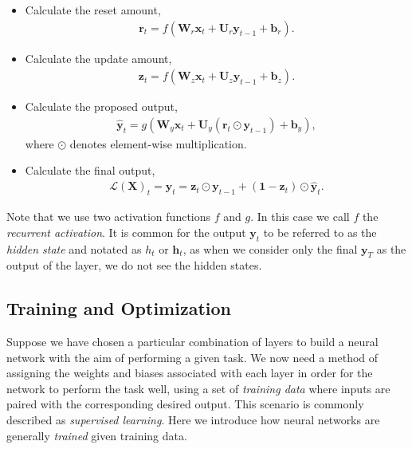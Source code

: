 \documentclass{somasmsc}
\begin{document}
\begin{itemize}
    \item Calculate the reset amount,
    \begin{align*}
    \pmb{r}_t = f(\mathbf{W}_r \pmb{x}_t + \mathbf{U}_r \pmb{y}_{t-1} + \pmb{b}_r).
    \end{align*}
    \item Calculate the update amount,
    \begin{align*}
    \pmb{z}_t = f(\mathbf{W}_z \pmb{x}_t + \mathbf{U}_z \pmb{y}_{t-1} + \pmb{b}_z).
    \end{align*}
    \item Calculate the proposed output,
    \begin{align*}
    \hat{\pmb{y}}_t = g(\mathbf{W}_y \pmb{x}_t + \mathbf{U}_y \left(\pmb{r}_t \odot \pmb{y}_{t-1}\right) + \pmb{b}_y),
    \end{align*}
    where $\odot$ denotes element-wise  multiplication.
    \item Calculate the final output,
    \begin{align*}
    \mathcal{L}\left(\mathbf{X}\right)_t = \pmb{y}_t = \pmb{z}_t \odot \pmb{y}_{t-1} + \left(\mathbf{1} - \pmb{z}_t\right) \odot \hat{\pmb{y}}_t.
    \end{align*}
\end{itemize}
Note that we use two activation functions $f$ and $g$. In this case we call $f$ the \textit{recurrent activation}. It is common for the output $\pmb{y}_t$ to be referred to as the \textit{hidden state} and notated as $h_t$ or $\pmb{h}_t$, as when we consider only the final $\pmb{y}_T$ as the output of the layer, we do not see the hidden states.

\subsection{Training and Optimization}\label{intro:train}

Suppose we have chosen a particular combination of layers to build a neural network with the aim of performing a given task. We now need a method of assigning the weights and biases associated with each layer in order for the network to perform the task well, using a set of \textit{training data} where inputs are paired with the corresponding desired output. This scenario is commonly described as \textit{supervised learning}. Here we introduce how neural networks are generally \textit{trained} given training data.
\end{document}
